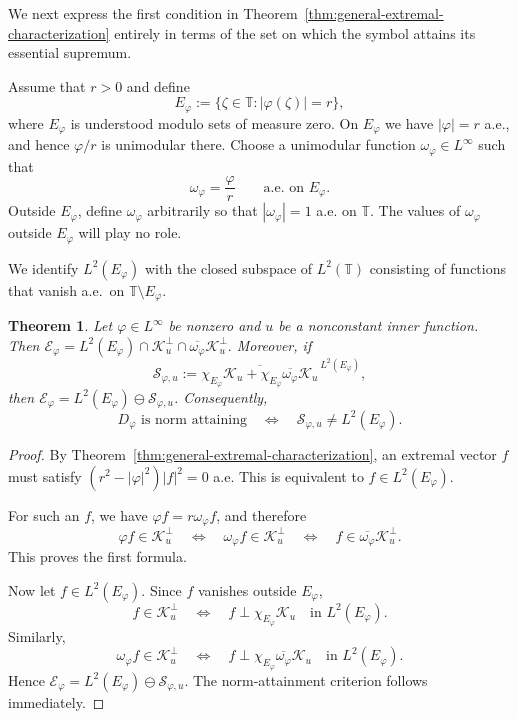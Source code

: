 \documentclass[12pt]{amsart}
\newtheorem{theorem}{Theorem}[section]
\theoremstyle{definition}
\theoremstyle{remark}
\def \T{\mathbb{T}}
\newcommand{\cle}{\mathcal{E}}
\newcommand{\clk}{\mathcal{K}}
\newcommand{\cls}{\mathcal{S}}
\newcommand{\vp}{\varphi}
\numberwithin{equation}{section}
\begin{document}
We next express the first condition in
Theorem~\ref{thm:general-extremal-characterization} entirely in terms
of the set on which the symbol attains its essential supremum.

Assume that $r>0$ and define
\[
E_\vp:=\{\zeta\in\T:|\vp(\zeta)|=r\},
\]
where $E_\vp$ is understood modulo sets of measure zero. On $E_\vp$
we have $|\vp|=r$ a.e., and hence $\vp/r$ is unimodular there.
Choose a unimodular function $\omega_\vp\in L^\infty$ such that
\[
\omega_\vp=\frac{\vp}{r}
\qquad\text{a.e. on }E_\vp.
\]
Outside $E_\vp$, define $\omega_\vp$ arbitrarily so that
$|\omega_\vp|=1$ a.e. on $\T$. The values of $\omega_\vp$ outside $E_\vp$ will play no role.

We identify $L^2(E_\vp)$ with the closed subspace of $L^2(\T)$
consisting of functions that vanish a.e.\ on $\T\setminus E_\vp$.

\begin{theorem}\label{thm:essential-maximum-characterization}
Let $\vp\in L^\infty$ be nonzero and $u$ be a nonconstant inner function. Then $\cle_\vp= L^2(E_\vp)\cap\clk_u^\perp \cap\overline{\omega_\vp}\clk_u^\perp.$
Moreover, if
\[
\cls_{\vp,u}:=\overline{\chi_{E_\vp}\clk_u
+\chi_{E_\vp}\overline{\omega_\vp}\clk_u}^{\,L^2(E_\vp)},
\]
then $\cle_\vp =L^2(E_\vp)\ominus\cls_{\vp,u}$. Consequently,
\[
D_\vp\text{ is norm attaining}\quad\Longleftrightarrow\quad
\cls_{\vp,u}\neq L^2(E_\vp).
\]
\end{theorem}

\begin{proof}
By Theorem~\ref{thm:general-extremal-characterization}, an extremal
vector $f$ must satisfy $(r^2-|\vp|^2)|f|^2=0$ a.e. This is equivalent to $f\in L^2(E_\vp)$.
	
For such an $f$, we have $\vp f=r\omega_\vp f$, and therefore
	\[
	\vp f\in\clk_u^\perp
	\quad\Longleftrightarrow\quad
	\omega_\vp f\in\clk_u^\perp
	\quad\Longleftrightarrow\quad
	f\in\overline{\omega_\vp}\clk_u^\perp.
	\]
This proves the first formula.
	
Now let $f\in L^2(E_\vp)$. Since $f$ vanishes outside $E_\vp$,
	\[
	f\in\clk_u^\perp
	\quad\Longleftrightarrow\quad
	f\perp\chi_{E_\vp}\clk_u
	\quad\text{in }L^2(E_\vp).
	\]
	Similarly,
	\[
	\omega_\vp f\in\clk_u^\perp
	\quad\Longleftrightarrow\quad
	f\perp
	\chi_{E_\vp}\overline{\omega_\vp}\clk_u
	\quad\text{in }L^2(E_\vp).
	\]
Hence $\cle_\vp=L^2(E_\vp)\ominus\cls_{\vp,u}$. The norm-attainment criterion follows immediately.
\end{proof}
\end{document}
